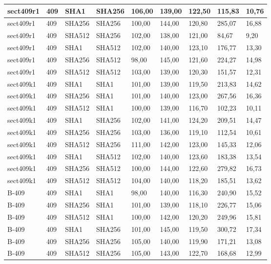 \begin{longtable}{| l | l | l | l | l |l |l |l |l |}
sect409r1 & 409 & SHA1 & SHA256 & 106,00 & 139,00 & 122,50 & 115,83 & 10,76 \\ \hline 
sect409r1 & 409 & SHA256 & SHA256 & 100,00 & 144,00 & 120,80 & 285,07 & 16,88 \\ \hline 
sect409r1 & 409 & SHA512 & SHA256 & 102,00 & 138,00 & 121,00 & 84,67 & 9,20 \\ \hline 
sect409r1 & 409 & SHA1 & SHA512 & 102,00 & 140,00 & 123,10 & 176,77 & 13,30 \\ \hline 
sect409r1 & 409 & SHA256 & SHA512 & 98,00 & 145,00 & 121,60 & 224,27 & 14,98 \\ \hline 
sect409r1 & 409 & SHA512 & SHA512 & 103,00 & 139,00 & 120,30 & 151,57 & 12,31 \\ \hline 
sect409k1 & 409 & SHA1 & SHA1 & 101,00 & 139,00 & 119,50 & 213,83 & 14,62 \\ \hline 
sect409k1 & 409 & SHA256 & SHA1 & 101,00 & 140,00 & 123,00 & 267,56 & 16,36 \\ \hline 
sect409k1 & 409 & SHA512 & SHA1 & 100,00 & 139,00 & 116,70 & 102,23 & 10,11 \\ \hline 
sect409k1 & 409 & SHA1 & SHA256 & 102,00 & 141,00 & 124,20 & 209,51 & 14,47 \\ \hline 
sect409k1 & 409 & SHA256 & SHA256 & 103,00 & 136,00 & 119,10 & 112,54 & 10,61 \\ \hline 
sect409k1 & 409 & SHA512 & SHA256 & 111,00 & 142,00 & 123,00 & 145,33 & 12,06 \\ \hline 
sect409k1 & 409 & SHA1 & SHA512 & 102,00 & 140,00 & 123,60 & 183,38 & 13,54 \\ \hline 
sect409k1 & 409 & SHA256 & SHA512 & 100,00 & 144,00 & 122,60 & 279,82 & 16,73 \\ \hline 
sect409k1 & 409 & SHA512 & SHA512 & 104,00 & 140,00 & 118,20 & 185,51 & 13,62 \\ \hline 
B-409 & 409 & SHA1 & SHA1 & 98,00 & 140,00 & 116,30 & 240,90 & 15,52 \\ \hline 
B-409 & 409 & SHA256 & SHA1 & 101,00 & 139,00 & 118,10 & 226,77 & 15,06 \\ \hline 
B-409 & 409 & SHA512 & SHA1 & 100,00 & 142,00 & 120,20 & 249,96 & 15,81 \\ \hline 
B-409 & 409 & SHA1 & SHA256 & 101,00 & 145,00 & 119,50 & 300,72 & 17,34 \\ \hline 
B-409 & 409 & SHA256 & SHA256 & 105,00 & 140,00 & 119,90 & 171,21 & 13,08 \\ \hline 
B-409 & 409 & SHA512 & SHA256 & 105,00 & 143,00 & 122,70 & 168,68 & 12,99 \\ \hline 

\end{longtable}
